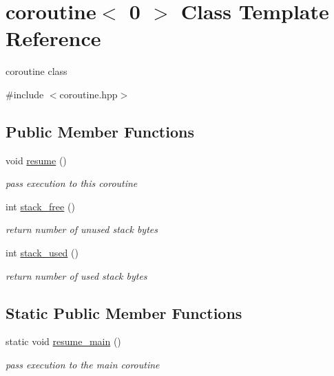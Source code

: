 \hypertarget{classcoroutine_3_010_01_4}{}\section{coroutine$<$ 0 $>$ Class Template Reference}
\label{classcoroutine_3_010_01_4}


coroutine class  




{\ttfamily \#include $<$coroutine.\+hpp$>$}

\subsection*{Public Member Functions}
\begin{DoxyCompactItemize}
\item 
void \hyperlink{classcoroutine_3_010_01_4_ab2afad14fd6145bc0588baec6b8bbe32}{resume} ()
\begin{DoxyCompactList}\small\item\em pass execution to this coroutine \end{DoxyCompactList}\item 
int \hyperlink{classcoroutine_3_010_01_4_af96766f45ce91a5c4e8a05a17f547ebb}{stack\+\_\+free} ()\hypertarget{classcoroutine_3_010_01_4_af96766f45ce91a5c4e8a05a17f547ebb}{}\label{classcoroutine_3_010_01_4_af96766f45ce91a5c4e8a05a17f547ebb}

\begin{DoxyCompactList}\small\item\em return number of unused stack bytes \end{DoxyCompactList}\item 
int \hyperlink{classcoroutine_3_010_01_4_a38b24aa521d80e98e2245ca7956510cb}{stack\+\_\+used} ()\hypertarget{classcoroutine_3_010_01_4_a38b24aa521d80e98e2245ca7956510cb}{}\label{classcoroutine_3_010_01_4_a38b24aa521d80e98e2245ca7956510cb}

\begin{DoxyCompactList}\small\item\em return number of used stack bytes \end{DoxyCompactList}\end{DoxyCompactItemize}
\subsection*{Static Public Member Functions}
\begin{DoxyCompactItemize}
\item 
static void \hyperlink{classcoroutine_3_010_01_4_ac7552b0b1e00a303967255a49b923edb}{resume\+\_\+main} ()
\begin{DoxyCompactList}\small\item\em pass execution to the main \textquotesingle{}coroutine\textquotesingle{} \end{DoxyCompactList}\end{DoxyCompactItemize}
